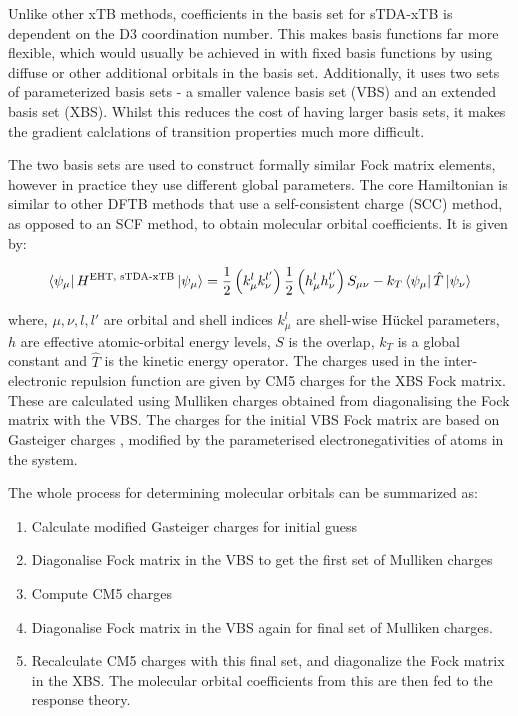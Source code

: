 Unlike other xTB methods, coefficients in the basis set for sTDA-xTB is dependent on the D3
coordination number. This makes basis functions far more flexible, which would usually
be achieved in with fixed basis functions by using diffuse or other additional orbitals in
the basis set. Additionally, it uses two sets of parameterized basis sets - a
smaller valence basis set (VBS) and an extended basis set (XBS). Whilst this reduces
the cost of having larger basis sets, it makes the gradient calclations of transition
properties much more difficult. 

The two basis sets are used to construct formally similar Fock matrix elements,
however in practice they use different global parameters. The core Hamiltonian
is similar to other DFTB methods that use a self-consistent charge (SCC) method, as
opposed to an SCF method, to obtain molecular orbital coefficients. It is given by:

\begin{equation}
\bra{\psi_\mu} H^{\text{EHT, sTDA-xTB}} \ket{\psi_\mu}= \frac{1}{2} \left(k^l_\mu k^{l'}_\nu\right) \frac{1}{2} \left(h^l_\mu h^{l'}_\nu\right) S_{\mu\nu} - k_T \bra{\psi_\mu}\hat{T}\ket{\psi_\nu}
\end{equation}

where, $\mu,\nu,l,l'$ are orbital and shell indices  $k^l_\mu$ are shell-wise 
H{\"u}ckel parameters, $h$ are effective atomic-orbital energy levels, $S$ is
the overlap, $k_T$ is a global constant and $\hat{T}$ is the kinetic energy 
operator. The charges used in the inter-electronic repulsion function are given 
by CM5 \cite{Marenich2012} charges for the XBS Fock matrix. These are calculated
using Mulliken charges obtained from diagonalising the Fock matrix with the VBS. 
The charges for the initial VBS Fock matrix are based on Gasteiger charges \cite{Gasteiger1978},
modified by the parameterised electronegativities of atoms in the system.

The whole process for determining molecular orbitals can be summarized as:
\begin{enumerate}
	\item Calculate modified Gasteiger charges for initial guess
	\item Diagonalise Fock matrix in the VBS to get the first set of Mulliken charges
	\item Compute CM5 charges
	\item Diagonalise Fock matrix in the VBS again for final set of Mulliken charges.
	\item Recalculate CM5 charges with this final set, and diagonalize the Fock matrix in the XBS. The molecular orbital coefficients from this are then fed to the response theory.
\end{enumerate}

